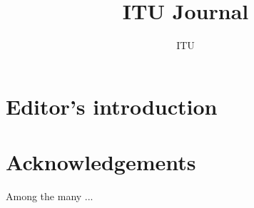 \documentclass[11pt,maintoc]{combine}
\title{ITU Journal}
\author{ITU}
\date{}
\begin{document}
	\pagestyle{combine}
	\maketitle
	\clearpage
	
	\tableofcontents
	\clearpage
	
	\listoffigures
	\clearpage
	
	\section{Editor’s introduction} \label{intro}
	\begin{papers}
		\label{article1}
		
		\label{article2}
		
		\label{article3}
		
	\end{papers}
	\clearpage
	\section{Acknowledgements}
	Among the many ...
\end{document}
